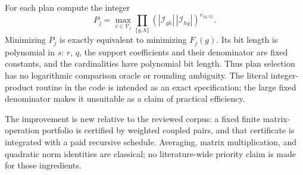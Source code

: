For each plan compute the integer
\[
 P_j=\max_{v\in\mathcal V_j}
 \prod_{\{g,h\}}
       \left(|\mathcal I_{gh}|\,|\mathcal I_{hg}|\right)^{v_{\{g,h\}}}.
\]
Minimizing $P_j$ is exactly equivalent to minimizing $F_j(g)$. Its bit
length is polynomial in $s$: $r$, $q$, the support coefficients and their
denominator are fixed constants, and the cardinalities have polynomial bit
length. Thus plan selection has no logarithmic comparison oracle or
rounding ambiguity. The literal integer-product routine in the code is
intended as an exact specification; the large fixed denominator makes it
unsuitable as a claim of practical efficiency.

The improvement is new relative to the reviewed corpus: a fixed finite
matrix-operation portfolio is certified by weighted coupled pairs, and
that certificate is integrated with a paid recursive schedule. Averaging,
matrix multiplication, and quadratic norm identities are classical; no
literature-wide priority claim is made for those ingredients.
